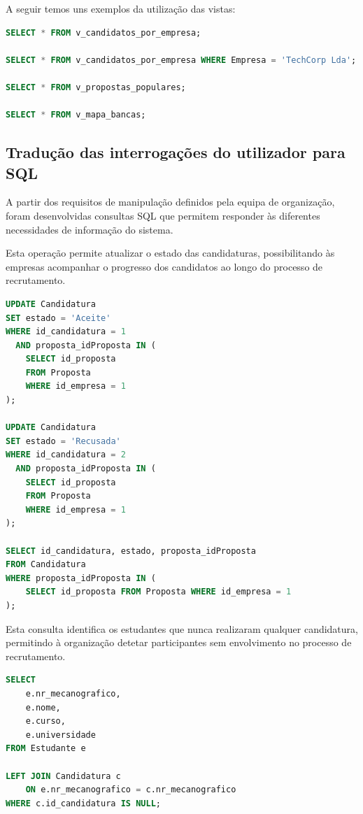 \documentclass[12pt,a4paper]{article}
\begin{document}
A seguir temos uns exemplos da utilização das vistas:

\begin{lstlisting}[language=SQL,caption={Exemplo de utilização das vistas}, label={lst:roles}]
SELECT * FROM v_candidatos_por_empresa;

SELECT * FROM v_candidatos_por_empresa WHERE Empresa = 'TechCorp Lda';

SELECT * FROM v_propostas_populares;

SELECT * FROM v_mapa_bancas;
\end{lstlisting}
\subsection{Tradução das interrogações do utilizador para SQL} %

A partir dos requisitos de manipulação definidos pela equipa de organização,
foram desenvolvidas consultas SQL que permitem responder às diferentes
necessidades de informação do sistema.

\newpage

Esta operação permite atualizar o estado das candidaturas, possibilitando às empresas acompanhar o progresso dos candidatos ao longo do processo de recrutamento.
\begin{lstlisting}[language=SQL,caption={Comando SQL que traduz o RM01}, label={lst:roles}]
UPDATE Candidatura
SET estado = 'Aceite'
WHERE id_candidatura = 1
  AND proposta_idProposta IN (
    SELECT id_proposta 
    FROM Proposta 
    WHERE id_empresa = 1 
);

UPDATE Candidatura
SET estado = 'Recusada'
WHERE id_candidatura = 2
  AND proposta_idProposta IN (
    SELECT id_proposta 
    FROM Proposta 
    WHERE id_empresa = 1  
);

SELECT id_candidatura, estado, proposta_idProposta 
FROM Candidatura 
WHERE proposta_idProposta IN (
    SELECT id_proposta FROM Proposta WHERE id_empresa = 1
);
\end{lstlisting}

Esta consulta identifica os estudantes que nunca realizaram qualquer
candidatura, permitindo à organização detetar participantes sem envolvimento no
processo de recrutamento.
\begin{lstlisting}[language=SQL,caption={Comando SQL que traduz o RM02}, label={lst:roles}]
SELECT 
    e.nr_mecanografico,
    e.nome,
    e.curso,
    e.universidade
FROM Estudante e

LEFT JOIN Candidatura c 
    ON e.nr_mecanografico = c.nr_mecanografico
WHERE c.id_candidatura IS NULL;
\end{lstlisting}
\end{document}

